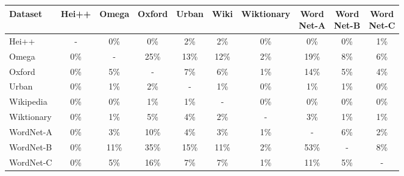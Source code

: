 \begin{tabular}{|l|ccccccccc|}
    \hline
    Dataset    & Hei++ & Omega & Oxford & Urban & Wiki & Wiktionary & \makecell{Word\\Net-A} & \makecell{Word\\Net-B} & \makecell{Word\\Net-C} \\
    \hline
    Hei++      & -     & 0\%   & 0\%    & 2\%   & 2\%       & 0\%        & 0\%       & 0\%       & 1\%       \\
    Omega      & 0\%   & -     & 25\%   & 13\%  & 12\%      & 2\%        & 19\%      & 8\%       & 6\%       \\
    Oxford     & 0\%   & 5\%   & -      & 7\%   & 6\%       & 1\%        & 14\%      & 5\%       & 4\%       \\
    Urban      & 0\%   & 1\%   & 2\%    & -     & 1\%       & 0\%        & 1\%       & 1\%       & 0\%       \\
    Wikipedia  & 0\%   & 0\%   & 1\%    & 1\%   & -         & 0\%        & 0\%       & 0\%       & 0\%       \\
    Wiktionary & 0\%   & 1\%   & 5\%    & 4\%   & 2\%       & -          & 3\%       & 1\%       & 1\%       \\
    WordNet-A  & 0\%   & 3\%   & 10\%   & 4\%   & 3\%       & 1\%        & -         & 6\%       & 2\%       \\
    WordNet-B  & 0\%   & 11\%  & 35\%   & 15\%  & 11\%      & 2\%        & 53\%      & -         & 8\%       \\
    WordNet-C  & 0\%   & 5\%   & 16\%   & 7\%   & 7\%       & 1\%        & 11\%      & 5\%       & -         \\
    \hline
\end{tabular}
